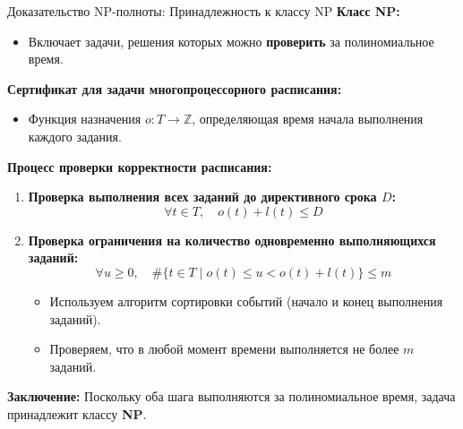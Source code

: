 \documentclass{beamer}
\begin{document}
\begin{frame}{Доказательство NP-полноты: Принадлежность к классу NP}
    \textbf{Класс NP:}
    \begin{itemize}
        \item Включает задачи, решения которых можно \textbf{проверить} за полиномиальное время.
    \end{itemize}

    \textbf{Сертификат для задачи многопроцессорного расписания:}
    \begin{itemize}
        \item Функция назначения \( o: T \rightarrow \mathbb{Z} \), определяющая время начала выполнения каждого задания.
    \end{itemize}

    \textbf{Процесс проверки корректности расписания:}
    \begin{enumerate}
        \item \textbf{Проверка выполнения всех заданий до директивного срока \( D \):}
        \[
        \forall t \in T, \quad o(t) + l(t) \leq D
        \]
        \item \textbf{Проверка ограничения на количество одновременно выполняющихся заданий:}
        \[
        \forall u \geq 0, \quad \#\{ t \in T \mid o(t) \leq u < o(t) + l(t) \} \leq m
        \]
        \begin{itemize}
            \item Используем алгоритм сортировки событий (начало и конец выполнения заданий).
            \item Проверяем, что в любой момент времени выполняется не более \( m \) заданий.
        \end{itemize}
    \end{enumerate}

    \textbf{Заключение:} Поскольку оба шага выполняются за полиномиальное время, задача принадлежит классу \textbf{NP}.
\end{frame}
\end{document}
